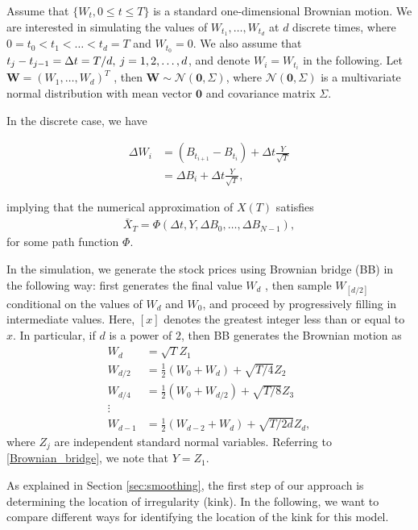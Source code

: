 \documentclass[11pt]{article}
\begin{document}
Assume that $\{W_t, 0 \leq t \leq T\} $ is a standard one-dimensional Brownian motion. We are interested in simulating the values of $W_{t_1},\dots, W_{t_d}$ at $d$ discrete times, where $0 = t_0 < t_1 <\dots < t_d = T $ and $W_{t_0}= 0$. We also assume that $t_j-t_{j-1}=\Delta t=T/d,\: j = 1, 2, \dots, d$, and denote $W_i = W_{t_i}$ in the following. Let $\mathbf{W} = (W_1,\dots, W_d )^T$ , then $\mathbf{W} \sim \mathcal{N}(\mathbf{0},\Sigma)$,
where $\mathcal{N}(\mathbf{0},\Sigma)$ is a multivariate normal distribution with mean vector $\mathbf{0}$ and covariance matrix $\Sigma$.

 In the discrete case, we have

\begin{align}\label{Brownian_bridge}
	\Delta W_i&=(B_{t_{i+1}}-B_{t_i})+\Delta t \frac{Y}{\sqrt{T}} \nonumber\\
	&= \Delta B_i + \Delta t \frac{Y}{\sqrt{T}},
\end{align}

implying that the numerical approximation of $X(T)$ satisfies
\begin{align}
	\bar{X}_T=\Phi(\Delta t, Y, \Delta B_0,\dots,\Delta B_{N-1}),
\end{align}
for some path function $\Phi$.



In the simulation, we generate the stock prices using Brownian bridge (BB) in the following way: first generates the final value $W_d$ , then sample $W_{[d/2]}$ conditional on the values of $W_d$ and $W_0$, and proceed by progressively filling in intermediate values. Here, $[x]$ denotes the greatest integer less than or equal to $x$. In particular, if $d$ is a power of $2$, then
BB generates the Brownian motion as
\begin{align}\label{BB}
	W_d&=\sqrt{T}Z_1\nonumber\\
   W_{d/2}&= \frac{1}{2}(W_{0}+W_{d})+\sqrt{T/4}Z_2\nonumber\\
    W_{d/4}&=\frac{1}{2} (W_{0}+W_{d/2})+\sqrt{T/8}Z_3\nonumber\\
    \vdots \nonumber\\
    W_{d-1}&= \frac{1}{2}(W_{d-2}+W_{d})+\sqrt{T/2d}Z_d,
\end{align}
where $Z_j$ are independent standard normal variables. Referring to \eqref{Brownian_bridge}, we note that $Y=Z_1$.



As explained in Section \ref{sec:smoothing}, the first step of our approach is determining the location of irregularity (kink). In the following, we want to compare different ways for identifying the location of the kink for this model.
\end{document}
